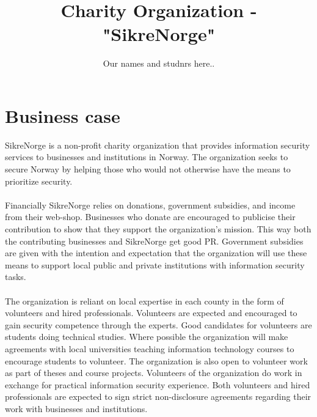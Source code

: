 


\title{Charity Organization - "SikreNorge"}
\author{Our names and studnrs here..}



\maketitle


\thispagestyle{empty}

\clearpage
{}
\setcounter{page}{1}
\tableofcontents

\clearpage
{}


\section{Business case}

SikreNorge is a non-profit charity organization that provides information security services to businesses and institutions in Norway. The organization seeks to secure Norway by helping those who would not otherwise have the means to prioritize security.
\\
\\
Financially SikreNorge relies on donations, government subsidies, and income from their web-shop. Businesses who donate are encouraged to publicise their contribution to show that they support the organization's mission. This way both the contributing businesses and SikreNorge get good PR. Government subsidies are given with the intention and expectation that the organization will use these means to support local public and private institutions with information security tasks.
\\
\\
The organization is reliant on local expertise in each county in the form of volunteers and hired professionals. Volunteers are expected and encouraged to gain security competence through the experts. Good candidates for volunteers are students doing technical studies. Where possible the organization will make agreements with local universities teaching information technology courses to encourage students to volunteer. The organization is also open to volunteer work as part of theses and course projects. Volunteers of the organization do work in exchange for practical information security experience. Both volunteers and hired professionals are expected to sign strict non-disclosure agreements regarding their work with businesses and institutions.

